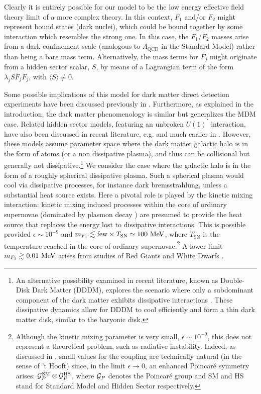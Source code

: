 \documentclass[12pt]{article}
\begin{document}
Clearly it is entirely possible for our model to be the low energy effective field theory limit of a more complex theory. In this context, $F _1$ and/or $F _2$ might represent bound states (dark nuclei), which could be bound together by some interaction which resembles the strong one. In this case, the $F_1$/$F_2$ masses arise from a dark confinement scale (analogous to $\Lambda _{\text{QCD}}$ in the Standard Model) rather than being a bare mass term. Alternatively, the mass terms for $F _j$ might originate from a hidden sector scalar, $S$, by means of a Lagrangian term of the form $\lambda _jS\bar{F} _jF _j$, with $\langle S \rangle \neq 0$.

Some possible implications of this model for dark matter direct detection experiments have been discussed previously in \cite{hiddensector}. Furthermore, as explained in the introduction, the dark matter phenomenology is similar but generalizes the MDM case. Related hidden sector models, featuring an unbroken $U(1) ^{'}$ interaction, have also been discussed in recent literature, e.g. \cite{feng,cline6,petrakiatomic} and much earlier in \cite{goldberghall}. However, these models assume parameter space where the dark matter galactic halo is in the form of atoms (or a non dissipative plasma), and thus can be collisional but generally not dissipative.\footnote{An alternative possibility examined in recent literature, known as Double-Disk Dark Matter (DDDM), explores the scenario where only a subdominant component of the dark matter exhibits dissipative interactions \cite{dddm}. These dissipative dynamics allow for DDDM to cool efficiently and form a thin dark matter disk, similar to the baryonic disk.} We consider the case where the galactic halo is in the form of a roughly spherical dissipative plasma. Such a spherical plasma would cool via dissipative processes, for instance dark bremsstrahlung, unless a substantial heat source exists. Here a pivotal role is played by the kinetic mixing interaction: kinetic mixing induced processes within the core of ordinary supernovae (dominated by plasmon decay \cite{raf,updated}) are presumed to provide the heat source that replaces the energy lost to dissipative interactions. This is possible provided $\epsilon \sim 10 ^{-9}$ and $m _{F_1} \lesssim {\rm few} \times T _{\text{SN}} \simeq 100 \ {\rm MeV}$, where $T _{\text{SN}}$ is the temperature reached in the core of ordinary supernovae.\footnote{Although the kinetic mixing parameter is very small, $\epsilon \sim 10 ^{-9}$, this does not represent a theoretical problem, such as radiative instability. Indeed, as discussed in \cite{poincare}, small values for the coupling are technically natural (in the sense of 't Hooft) since, in the limit $\epsilon \rightarrow 0$, an enhanced Poincar\'e symmetry arises: ${\cal G} _P ^{\text{SM}} \otimes {\cal G} _P ^{\text{HS}}$, where ${\cal G} _P$ denotes the Poincar\'e group and SM and HS stand for Standard Model and Hidden Sector respectively.} A lower limit $m _{F_1} \gtrsim 0.01 \ {\rm MeV}$ arises from studies of Red Giants and White Dwarfs \cite{updated}.
\end{document}
